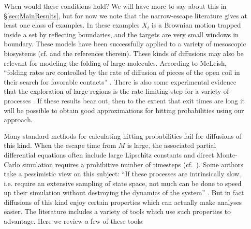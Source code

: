 \documentclass[12pt, nofootinbib,english, amsmath, amssymb, aps, priprint, graphicx,floatfix]{revtex4-1}
\theoremstyle{plain}
\theoremstyle{definition}
\theoremstyle{plain}
\begin{document}
When would these conditions hold? We will have more to say about this in \S\ref{sec:MainResults}, but for now we note that the narrow-escape literature gives at least one class of examples.  In these examples $X_t$ is a Brownian motion trapped inside a set by reflecting boundaries, and the targets are very small windows in boundary.  These models have been successfully applied to a variety of mesoscopic biosystems (cf. \cite{schuss2007narrow} and the references therein).  These kinds of diffusions may also be relevant for modeling the folding of large molecules.  According to McLeish,  ``folding rates are controlled by the rate of diffusion of pieces of the open coil in their search for favorable contacts'' \cite{McLeish2005-dq}.  There is also some experimental evidence that the exploration of large regions is the rate-limiting step for a variety of processes \cite{Goldberg1999-mv,Jacob1999-bs,Plaxco1998-iv,Wales2006-ur}.  If these results bear out, then to the extent that exit times are long it will be possible to obtain good approximations for hitting probabilities using our approach.

Many standard methods for calculating hitting probabilities fail for diffusions of this kind.  When the escape time from $M$ is large, the associated partial differential equations often include large Lipschitz constants and direct Monte-Carlo simulation requires a prohibitive number of timesteps (cf.\ \cite{Baum1986-we, Wille1987-tf, Machta2009-gh}).  Some authors take a pessimistic view on this subject: ``If these processes are intrinsically slow, i.e. require an extensive sampling of state space, not much can be done to speed up their simulation without destroying the dynamics of the system'' \cite{Christen2008-ge}.
But in fact diffusions of this kind enjoy certain properties which can actually make analyses easier.  The literature includes a variety of tools which use such properties to advantage.  Here we review a few of these tools:
\end{document}
